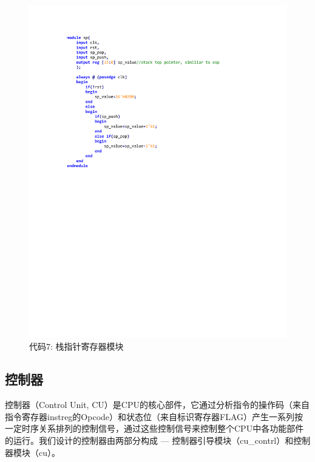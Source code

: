 \documentclass[titlepage, 11pt]{article}
\begin{document}
			\begin{figure}[H]
				\centering
				\includegraphics[scale=1]{26.pdf}
				\caption*{代码7: 栈指针寄存器模块}
			\end{figure}
		\subsection{控制器}
		控制器（Control Unit, CU）是CPU的核心部件，它通过分析指令的操作码（来自指令寄存器instreg的Opcode）和状态位（来自标识寄存器FLAG）产生一系列按一定时序关系排列的控制信号，通过这些控制信号来控制整个CPU中各功能部件的运行。我们设计的控制器由两部分构成 — 控制器引导模块（cu\_contrl）和控制器模块（cu）。
\end{document}
